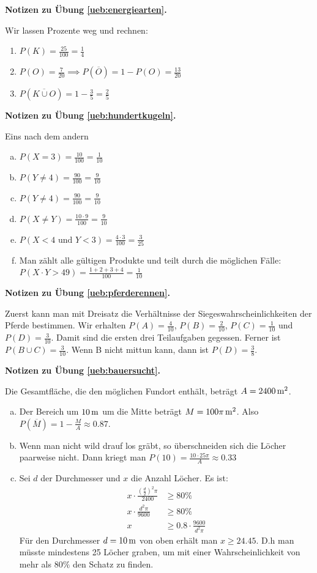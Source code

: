 \documentclass[%
11pt,%
twoside,%
titlepage,%
german,%
headsepline%
]{scrartcl}
\newcommand{\concatueb}[1]{ueb:#1}%
\newcommand{\concatlsg}[1]{lsg:#1}%
\newenvironment{lsg}[1]{%
    \par\noindent\textbf{Notizen zu Übung \ref{\concatueb{#1}}.}%
    \label{\concatlsg{#1}}
}{%
    \par%
}
\begin{document}
\begin{lsg}{energiearten}
Wir lassen Prozente weg und rechnen:
\begin{enumerate}
\item $P(K)=\frac{25}{100}=\frac{1}{4}$
\item $P(O)=\frac{7}{20}\implies P(\overline{O})=1-P(O)=\frac{13}{20}$
\item $P(\overline{K\cup O})=1-\frac{3}{5}=\frac{2}{5}$
\end{enumerate}
\end{lsg}

\begin{lsg}{hundertkugeln}
Eins nach dem andern
\begin{enumerate}[a)]
\item $P(X=3)=\frac{10}{100}=\frac{1}{10}$
\item $P(Y\neq4)=\frac{90}{100}=\frac{9}{10}$
\item $P(Y\neq4)=\frac{90}{100}=\frac{9}{10}$
\item $P(X \neq Y)=\frac{10\cdot9}{100}=\frac{9}{10}$
\item $P(X < 4\text{ und } Y < 3)=\frac{4\cdot 3}{100}=\frac{3}{25}$
\item Man z\"ahlt alle g\"ultigen Produkte und teilt durch die m\"oglichen F\"alle: $P(X\cdot Y > 49)=\frac{1+2+3+4}{100}=\frac{1}{10}$
\end{enumerate}
\end{lsg}

\begin{lsg}{pferderennen}
Zuerst kann man mit Dreisatz die Verh\"altnisse der Siegeswahrscheinlichkeiten der Pferde bestimmen. Wir erhalten $P(A)=\frac{4}{10}$, $P(B)=\frac{2}{10}$, $P(C)=\frac{1}{10}$ und $P(D)=\frac{3}{10}$. Damit sind die ersten drei Teilaufgaben gegessen. Ferner ist $P(B\cup C)=\frac{3}{10}$. Wenn B nicht mittun kann, dann ist $P(D)=\frac{3}{8}$.
\end{lsg}

\begin{lsg}{bauersucht}
Die Gesamtfl\"ache, die den m\"oglichen Fundort enth\"alt, betr\"agt $A=\unit[2400]{m^{2}}$.
\begin{enumerate}[a)]
\item Der Bereich um $\unit[10]{m}$ um die Mitte betr\"agt $M=\unit[100\pi]{m^{2}}$. Also $P(\overline{M})=1-\frac{M}{A}\approx0.87$.
\item Wenn man nicht wild drauf los gr\"abt, so \"uberschneiden sich die L\"ocher paarweise nicht. Dann kriegt man $P(10)=\frac{10\cdot25\pi}{A}\approx0.33$
\item Sei $d$ der Durchmesser und $x$ die Anzahl L\"ocher. Es ist:
\begin{align*}
x\cdot\frac{(\frac{d}{2})^{2}\pi}{2400} &\geq80\%\\
x\cdot\frac{d^{2}\pi}{9600} &\geq80\%\\
x &\geq 0.8\cdot\frac{9600}{d^{2}\pi}
\end{align*}
F\"ur den Durchmesser $d=\unit[10]{m}$ von oben erh\"alt man $x\geq24.45$. D.h man m\"usste mindestens 25 L\"ocher graben, um mit einer Wahrscheinlichkeit von mehr als $80\%$ den Schatz zu finden.
\end{enumerate}
\end{lsg}
\end{document}
